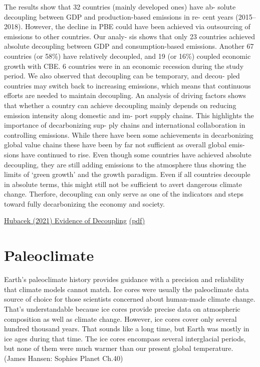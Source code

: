 \documentclass[
]{book}
\begin{document}
The results show that 32 countries (mainly developed ones) have ab-
solute decoupling between GDP and production-based emissions in re-
cent years (2015--2018). However, the decline in PBE could have been
achieved via outsourcing of emissions to other countries. Our analy-
sis shows that only 23 countries achieved absolute decoupling between
GDP and consumption-based emissions. Another 67 countries (or 58\%)
have relatively decoupled, and 19 (or 16\%) coupled economic growth
with CBE. 6 countries were in an economic recession during the study
period. We also observed that decoupling can be temporary, and decou-
pled countries may switch back to increasing emissions, which means
that continuous eﬀorts are needed to maintain decoupling. An analysis
of driving factors shows that whether a country can achieve decoupling
mainly depends on reducing emission intensity along domestic and im-
port supply chains. This highlights the importance of decarbonizing sup-
ply chains and international collaboration in controlling emissions.
While there have been some achievements in decarbonizing global
value chains these have been by far not suﬃcient as overall global emis-
sions have continued to rise. Even though some countries have achieved
absolute decoupling, they are still adding emissions to the atmosphere
thus showing the limits of `green growth' and the growth paradigm.
Even if all countries decouple in absolute terms, this might still not be
suﬃcient to avert dangerous climate change. Therfore, decoupling can
only serve as one of the indicators and steps toward fully decarbonizing
the economy and society.

\href{https://www.sciencedirect.com/science/article/pii/S2666792421000664?via\%3Dihub}{Hubacek (2021) Evidence of Decoupling}
\href{pdf/Hubacek_2021_Evidence_of_Decoupling.pdf}{(pdf)}

\hypertarget{paleoclimate}{%
\chapter{Paleoclimate}\label{paleoclimate}}

Earth's paleoclimate history provides guidance with a precision and reliability that climate
models cannot match. Ice cores were usually the paleoclimate data source of choice for those
scientists concerned about human-made climate change. That's understandable because ice
cores provide precise data on atmospheric composition as well as climate change.
However, ice cores cover only several hundred thousand years. That sounds like a long time, but
Earth was mostly in ice ages during that time. The ice cores encompass several interglacial
periods, but none of them were much warmer than our present global temperature.
(James Hansen: Sophies Planet Ch.40)
\end{document}
